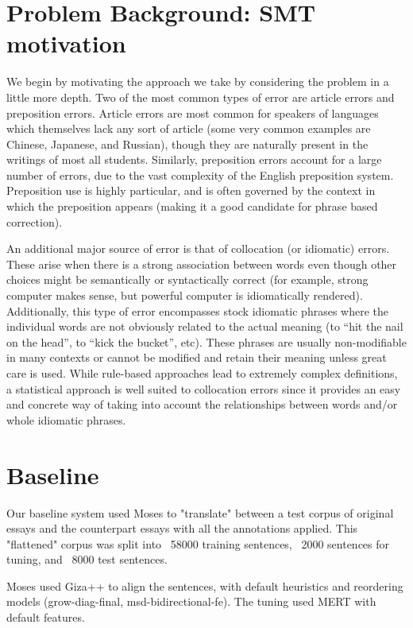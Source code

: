\documentclass[11pt,letterpaper]{article}
\begin{document}
\section{Problem Background: SMT motivation}
\indent We begin by motivating the approach we take by considering the problem in a little more depth. Two of the most common types of error are article errors and preposition errors. 
Article errors are most common for speakers of languages which themselves lack any sort of article 
(some very common examples are Chinese, Japanese, and Russian), though they are naturally present 
in the writings of most all students. Similarly, preposition errors account for a large number of 
errors, due to the vast complexity of the English preposition system. Preposition use is highly particular, 
and is often governed by the context in which the preposition appears (making it a good candidate for 
phrase based correction). \newline

\indent An additional major source of error is that of collocation (or idiomatic) errors. These 
arise when there is a strong association between words even though other choices might be semantically 
or syntactically correct (for example, strong computer makes sense, but powerful computer is idiomatically 
rendered). Additionally, this type of error encompasses stock idiomatic phrases where the individual words 
are not obviously related to the actual meaning (to “hit the nail on the head”, to “kick the bucket”, etc). 
These phrases are usually non-modifiable in many contexts or cannot be modified and retain their meaning 
unless great care is used. While rule-based approaches lead to extremely complex definitions, a 
statistical approach is well suited to collocation errors since it provides an easy and concrete way 
of taking into account the relationships between words and/or whole idiomatic phrases. \newline

\section{Baseline}
Our baseline system used Moses to "translate" between a test corpus of original essays and the counterpart essays with all the annotations applied. This "flattened" corpus was split into ~58000 training sentences, ~2000 sentences for tuning, and ~8000 test sentences. 

Moses used Giza++ to align the sentences, with default heuristics and reordering models (grow-diag-final, msd-bidirectional-fe). The tuning used MERT with default features. 
\end{document}
